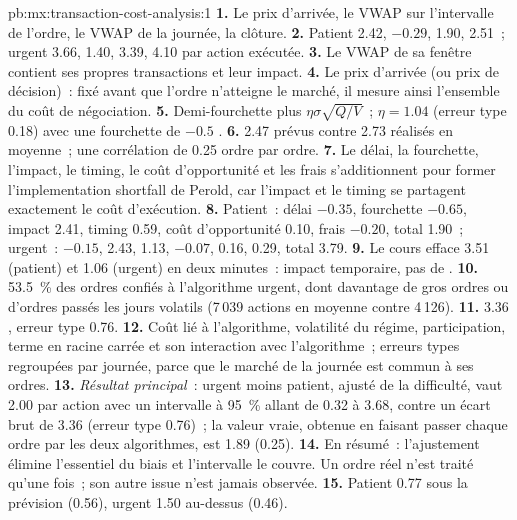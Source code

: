 \begin{solution}{pb:mx:transaction-cost-analysis:1}
\textbf{1.} Le prix d'arrivée, le VWAP sur l'intervalle de l'ordre, le VWAP de la journée, la clôture.
\textbf{2.} Patient 2.42, $-0.29$, 1.90, 2.51~; urgent 3.66, 1.40, 3.39, 4.10  par action exécutée.
\textbf{3.} Le VWAP de sa fenêtre contient ses propres transactions et leur impact.
\textbf{4.} Le prix d'arrivée (ou prix de décision)~: fixé avant que l'ordre n'atteigne le marché, il mesure ainsi l'ensemble du coût de négociation.
\textbf{5.} Demi-fourchette plus $\eta\sigma\sqrt{Q/V}$~; $\eta=1.04$ (erreur type 0.18) avec une fourchette de $-0.5$ .
\textbf{6.} 2.47 prévus contre 2.73 réalisés en moyenne~; une corrélation de 0.25 ordre par ordre.
\textbf{7.} Le délai, la fourchette, l'impact, le timing, le coût d'opportunité et les frais s'additionnent pour former l'implementation shortfall de Perold, car l'impact et le timing se partagent exactement le coût d'exécution.
\textbf{8.} Patient~: délai $-0.35$, fourchette $-0.65$, impact 2.41, timing 0.59, coût d'opportunité 0.10, frais $-0.20$, total 1.90~; urgent~: $-0.15$, 2.43, 1.13,
$-0.07$, 0.16, 0.29, total 3.79.
\textbf{9.} Le cours efface 3.51  (patient) et 1.06 (urgent) en deux minutes~: impact temporaire, pas de .
\textbf{10.} 53.5~\% des ordres confiés à l'algorithme urgent, dont davantage de gros ordres ou d'ordres passés les jours volatils (7\,039 actions en moyenne contre 4\,126).
\textbf{11.} 3.36 , erreur type 0.76.
\textbf{12.} Coût lié à l'algorithme, volatilité du régime, participation, terme en racine carrée et son interaction avec l'algorithme~; erreurs types
regroupées par journée, parce que le marché de la journée est commun à ses ordres.
\textbf{13.} \emph{Résultat principal}~: urgent moins patient, ajusté de la difficulté, vaut 2.00  par action avec un intervalle à 95~\% allant de 0.32 à 3.68, contre
un écart brut de 3.36 (erreur type 0.76)~; la valeur vraie, obtenue en faisant passer chaque ordre par les deux algorithmes, est 1.89 (0.25).
\textbf{14.} En résumé~: l'ajustement élimine l'essentiel du biais et l'intervalle le couvre. Un ordre réel n'est traité qu'une fois~; son autre issue n'est jamais observée.
\textbf{15.} Patient 0.77  sous la prévision (0.56), urgent 1.50 au-dessus (0.46).

\end{solution}
